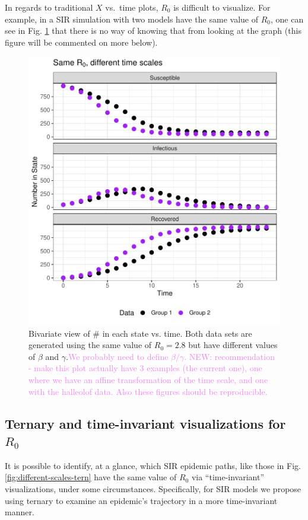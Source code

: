 \documentclass[
  shortnames]{jss}
\begin{document}
In regards to traditional \(X\) vs.~time plots, \(R_0\) is difficult to
visualize. For example, in a SIR simulation with two models have the
same value of \(R_0\), one can see in Fig.
\ref{fig:different-scales-standard} that there is no way of knowing that
from looking at the graph (this figure will be commented on more below).

\begin{figure}[!ht]
    \centering
    \includegraphics[width = .5\textwidth]{images/diff-time-standard.pdf}%
    \caption{Bivariate view of \# in each state vs. time. Both data sets are generated using the same value of $R_0 = 2.8$ but have different values of $\beta$ and $\gamma$.\textcolor{violet}{We probably need to define $\beta/\gamma$.}
\textcolor{violet}{NEW: recommendation - make this plot actually have 3 examples (the current one), one where we have an affine transformation of the time scale, and one with the halleolof data.} \textcolor{violet}{Also these figures should be reproducible.}}
    \label{fig:different-scales-standard}
\end{figure}

\subsection[ternary visualizations]{Ternary and time-invariant
visualizations for \(R_0\)}\label{sec:ternary}

It is possible to identify, at a glance, which SIR epidemic paths, like
those in Fig. \ref{fig:different-scales-tern} have the same value of
\(R_0\) via ``time-invariant'' visualizations, under some circumstances.
Specifically, for SIR models we propose using ternary to examine an
epidemic's trajectory in a more time-invariant manner.
\end{document}
